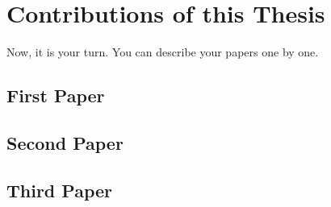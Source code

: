 
\section{Contributions of this Thesis} %
\label{sec:contributions}

Now, it is your turn.
You can describe your papers one by one.

\subsection[First Paper]{First Paper \cite{EPRINT:Doe36}} %
\label{sub:paper_1}

\lipsum[30-31]


\subsection[Second Paper]{Second Paper \cite{CCS:DDMS39}} %
\label{sub:paper_2}

\lipsum[32-33]


\subsection[Third Paper]{Third Paper \cite{NDSS:DoeSmi38}} %
\label{sub:paper_3}

\lipsum[34-35]


